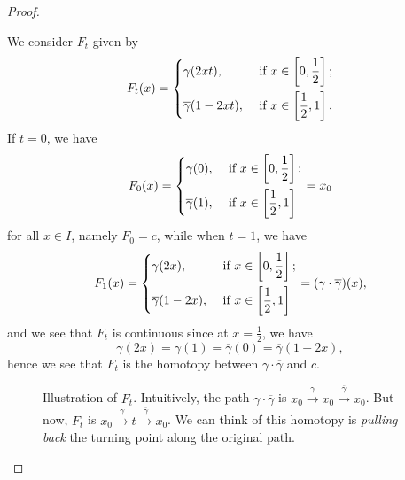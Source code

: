 \begin{proof}
\begin{itemize}
		      \par We consider \(F_t\) given by
		      \[
			      F_{t}(x) = \begin{dcases}
				      \gamma(2xt),              & \text{ if } x\in\left[0, \frac{1}{2}\right]; \\
				      \overline{\gamma}(1-2xt), & \text{ if } x\in\left[\frac{1}{2}, 1\right].
			      \end{dcases}
		      \]
		      If \(t = 0\), we have
		      \[
			      F_{0}(x) = \begin{dcases}
				      \gamma(0),            & \text{ if } x\in\left[0, \frac{1}{2}\right]; \\
				      \overline{\gamma}(1), & \text{ if } x\in\left[\frac{1}{2}, 1\right]
			      \end{dcases} = x_0
		      \]
		      for all \(x\in I\), namely \(F_0 = c\), while when \(t = 1\), we have
		      \[
			      F_{1}(x) = \begin{dcases}
				      \gamma(2x),              & \text{ if } x\in\left[0, \frac{1}{2}\right]; \\
				      \overline{\gamma}(1-2x), & \text{ if } x\in\left[\frac{1}{2}, 1\right]
			      \end{dcases} = (\gamma\cdot \overline{\gamma})(x),
		      \]
		      and we see that \(F_t\) is continuous since at \(x = \frac{1}{2}\), we have
		      \[
			      \gamma(2x) = \gamma(1) = \overline{\gamma} (0) = \overline{\gamma} (1 - 2x),
		      \]
		      hence we see that \(F_{t}\) is the homotopy between \(\gamma\cdot \overline{\gamma} \) and \(c\).
		      \begin{figure}[H]
			      \centering
			      \caption{Illustration of \(F_t\). Intuitively, the path \(\gamma\cdot \overline{\gamma}\) is \(x_0 \overset{\gamma}{\to} x_0 \overset{\overline{\gamma} }{\to} x_0\).
				      But now, \(F_t\) is \(x_0 \overset{\gamma}{\to} t \overset{\overline{\gamma} }{\to} x_0\). We can think of this homotopy is \emph{pulling back}
				      the turning point along the original path.}
			      \label{fig:def:fundamental-group}
		      \end{figure}
	\end{itemize}
\end{proof}

